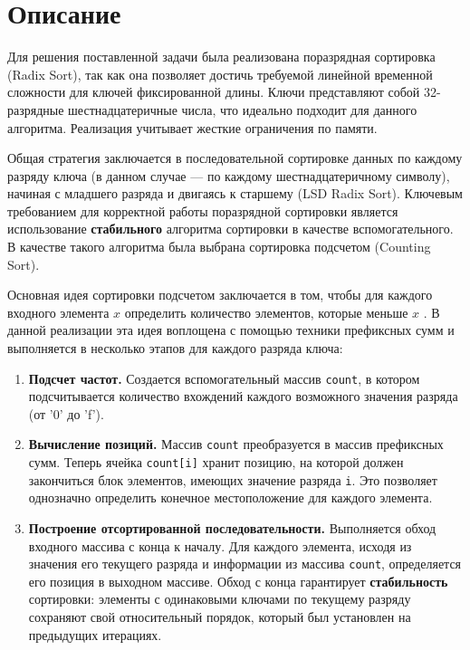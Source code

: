 \section{Описание}

Для решения поставленной задачи была реализована поразрядная сортировка (Radix Sort), так как она позволяет достичь требуемой линейной временной сложности для ключей фиксированной длины. Ключи представляют собой 32-разрядные шестнадцатеричные числа, что идеально подходит для данного алгоритма. Реализация учитывает жесткие ограничения по памяти.

Общая стратегия заключается в последовательной сортировке данных по каждому разряду ключа (в данном случае — по каждому шестнадцатеричному символу), начиная с младшего разряда и двигаясь к старшему (LSD Radix Sort). Ключевым требованием для корректной работы поразрядной сортировки является использование \textbf{стабильного} алгоритма сортировки в качестве вспомогательного. В качестве такого алгоритма была выбрана сортировка подсчетом (Counting Sort).

Основная идея сортировки подсчетом заключается в том, чтобы для каждого входного 
элемента $x$ определить количество элементов, которые меньше $x$ \cite{Kormen}. В данной реализации эта идея воплощена с помощью техники префиксных сумм и выполняется в несколько этапов для каждого разряда ключа:
\begin{enumerate}
    \item \textbf{Подсчет частот.} Создается вспомогательный массив \texttt{count}, в котором подсчитывается количество вхождений каждого возможного значения разряда (от '0' до 'f').
    \item \textbf{Вычисление позиций.} Массив \texttt{count} преобразуется в массив префиксных сумм. Теперь ячейка \texttt{count[i]} хранит позицию, на которой должен закончиться блок элементов, имеющих значение разряда \texttt{i}. Это позволяет однозначно определить конечное местоположение для каждого элемента.
    \item \textbf{Построение отсортированной последовательности.} Выполняется обход входного массива с конца к началу. Для каждого элемента, исходя из значения его текущего разряда и информации из массива \texttt{count}, определяется его позиция в выходном массиве. Обход с конца гарантирует \textbf{стабильность} сортировки: элементы с одинаковыми ключами по текущему разряду сохраняют свой относительный порядок, который был установлен на предыдущих итерациях.
\end{enumerate}

